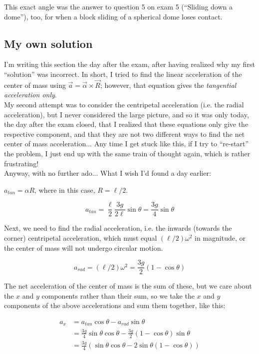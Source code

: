 \documentclass[8.01x]{subfiles}
\begin{document}
This exact angle was the answer to question 5 on exam 5 (``Sliding down a dome''), too, for when a block sliding of a spherical dome loses contact.

\subsection{My own solution}

I'm writing this section the day after the exam, after having realized why my first ``solution'' was incorrect. In short, I tried to find the linear acceleration of the center of mass using $\vec{a} = \vec{\alpha} \times \vec{R}$; however, that equation gives the \emph{tangential acceleration only}.\\
My second attempt was to consider the centripetal acceleration (i.e. the radial acceleration), but I never considered the large picture, and so it was only today, the day after the exam closed, that I realized that these equations only give the respective component, and that they are not two different ways to find the net center of mass acceleration... Any time I get stuck like this, if I try to ``re-start'' the problem, I just end up with the same train of thought again, which is rather frustrating!\\
Anyway, with no further ado... What I wish I'd found a day earlier:

$a_{tan} = \alpha R$, where in this case, $R = \ell/2$.

\begin{equation}
a_{tan} = \frac{\ell}{2} \frac{3 g}{2 \ell} \sin \theta = \frac{3 g}{4} \sin \theta
\end{equation}

Next, we need to find the radial acceleration, i.e. the inwards (towards the corner) centripetal acceleration, which must equal $(\ell/2) \omega^2$ in magnitude, or the center of mass will not undergo circular motion.

\begin{equation}
a_{rad} = (\ell/2) \omega^2 = \frac{3 g}{2} (1 - \cos \theta)
\end{equation}

The net acceleration of the center of mass is the sum of these, but we care about the $x$ and $y$ components rather than their sum, so we take the $x$ and $y$ components of the above accelerations and sum them together, like this:

\begin{align}
a_x &= a_{tan} \cos \theta - a_{rad} \sin \theta\\
    &= \frac{3 g}{4} \sin \theta \cos \theta - \frac{3 g}{2} (1 - \cos \theta) \sin \theta\\
    &= \frac{3 g}{4} \left(\sin \theta \cos \theta - 2 \sin \theta (1 - \cos \theta) \right)
\end{align}
\end{document}
